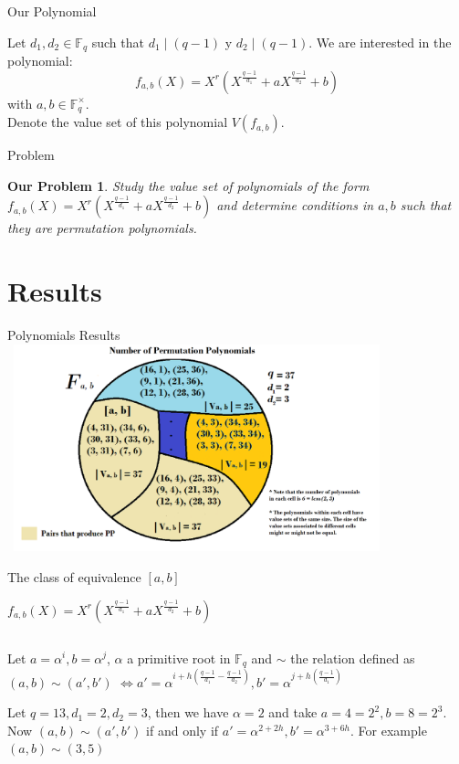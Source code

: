 \documentclass{beamer}
\newtheorem{ourproblem}{Our Problem}
\begin{document}

\begin{frame}{Our Polynomial}
  

  Let $d_1, d_2 \in \mathbb{F}_q$ such that $d_1 \mid (q-1)$ y $d_2 \mid (q-1)$. We are interested in the polynomial:
  {\Large$$f_{a,b}(X) = X^r(X^{\frac{q-1}{d_1}} + aX^{\frac{q-1}{d_2}} +b)$$ }
  with $a,b \in \mathbb{F}_q^{\times}$. 
  \pause 
  $$$$
  Denote the value set of this polynomial $V(f_{a,b})$.

\end{frame}

\begin{frame}{Problem}
  \begin{ourproblem}
    Study the value set of polynomials of the form $f_{a,b}(X) = X^r(X^{\frac{q-1}{d_1}} + aX^{\frac{q-1}{d_2}} +b)$ and determine conditions in $a,b$ such that they are permutation polynomials.
  \end{ourproblem}
\end{frame}

\section{Results} %
\label{sec:results}

\begin{frame}{Polynomials Results}
  \includegraphics[width=11cm, height=6cm]{clases}
\end{frame}

\begin{frame}{The class of equivalence $[a,b]$}
  
  {\Large $f_{a,b}(X) = X^r(X^{\frac{q-1}{d_1}} + aX^{\frac{q-1}{d_2}} +b)$}

  $$$$

  Let $a = \alpha^i, b = \alpha^j$, $\alpha$ a primitive root in $\mathbb{F}_q$ and $\sim$ the relation defined as $(a,b) \sim (a', b')$ 
  $\Longleftrightarrow a' = \alpha^{i+h(\frac{q-1}{d_1} - \frac{q-1}{d_2})}, b' = \alpha^{j+h(\frac{q-1}{d_1})}$

  \begin{example}
    Let $q = 13, d_1 = 2, d_2 = 3$, then we have $\alpha = 2$ and take $a = 4 = 2^2, b = 8 = 2^3$. Now $(a,b) \sim (a',b')$ if and only if
    $a' = \alpha^{2+2h}, b' = \alpha^{3+6h}$. For example $(a,b) \sim (3,5)$
  \end{example}

\end{frame}
\end{document}
